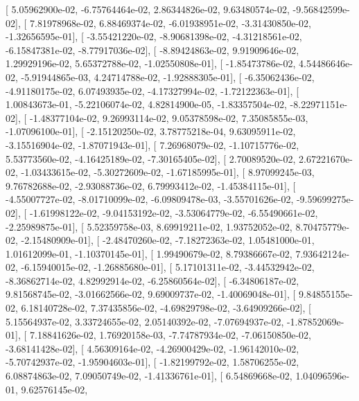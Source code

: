 \documentclass{article}
\begin{document}
       [  5.05962900e-02,  -6.75764464e-02,   2.86344826e-02,
          9.63480574e-02,  -9.56842599e-02],
       [  7.81978968e-02,   6.88469374e-02,  -6.01938951e-02,
         -3.31430850e-02,  -1.32656595e-01],
       [ -3.55421220e-02,  -8.90681398e-02,  -4.31218561e-02,
         -6.15847381e-02,  -8.77917036e-02],
       [ -8.89424863e-02,   9.91909646e-02,   1.29929196e-02,
          5.65372788e-02,  -1.02550808e-01],
       [ -1.85473786e-02,   4.54486646e-02,  -5.91944865e-03,
          4.24714788e-02,  -1.92888305e-01],
       [ -6.35062436e-02,  -4.91180175e-02,   6.07493935e-02,
         -4.17327994e-02,  -1.72122363e-01],
       [  1.00843673e-01,  -5.22106074e-02,   4.82814900e-05,
         -1.83357504e-02,  -8.22971151e-02],
       [ -1.48377104e-02,   9.26993114e-02,   9.05378598e-02,
          7.35085855e-03,  -1.07096100e-01],
       [ -2.15120250e-02,   3.78775218e-04,   9.63095911e-02,
         -3.15516904e-02,  -1.87071943e-01],
       [  7.26968079e-02,  -1.10715776e-02,   5.53773560e-02,
         -4.16425189e-02,  -7.30165405e-02],
       [  2.70089520e-02,   2.67221670e-02,  -1.03433615e-02,
         -5.30272609e-02,  -1.67185995e-01],
       [  8.97099245e-03,   9.76782688e-02,  -2.93088736e-02,
          6.79993412e-02,  -1.45384115e-01],
       [ -4.55007727e-02,  -8.01710099e-02,  -6.09809478e-03,
         -3.55701626e-02,  -9.59699275e-02],
       [ -1.61998122e-02,  -9.04153192e-02,  -3.53064779e-02,
         -6.55490661e-02,  -2.25989875e-01],
       [  5.52359758e-03,   8.69919211e-02,   1.93752052e-02,
          8.70475779e-02,  -2.15480909e-01],
       [ -2.48470260e-02,  -7.18272363e-02,   1.05481000e-01,
          1.01612099e-01,  -1.10370145e-01],
       [  1.99490679e-02,   8.79386667e-02,   7.93642124e-02,
         -6.15940015e-02,  -1.26885680e-01],
       [  5.17101311e-02,  -3.44532942e-02,  -8.36862714e-02,
          4.82992914e-02,  -6.25860564e-02],
       [ -6.34806187e-02,   9.81568745e-02,  -3.01662566e-02,
          9.69009737e-02,  -1.40069048e-01],
       [  9.84855155e-02,   6.18140728e-02,   7.37435856e-02,
         -4.69829798e-02,  -3.64909266e-02],
       [  5.15564937e-02,   3.33724655e-02,   2.05140392e-02,
         -7.07694937e-02,  -1.87852069e-01],
       [  7.18841626e-02,   1.76920158e-03,  -7.74787934e-02,
         -7.06150850e-02,  -3.68141428e-02],
       [  4.56309164e-02,  -4.26900429e-02,  -1.96142010e-02,
         -5.70742937e-02,  -1.95904603e-01],
       [ -1.82199792e-02,   1.58706255e-02,   6.08874863e-02,
          7.09050749e-02,  -1.41336761e-01],
       [  6.54869668e-02,   1.04096596e-01,   9.62576145e-02,
\end{document}
